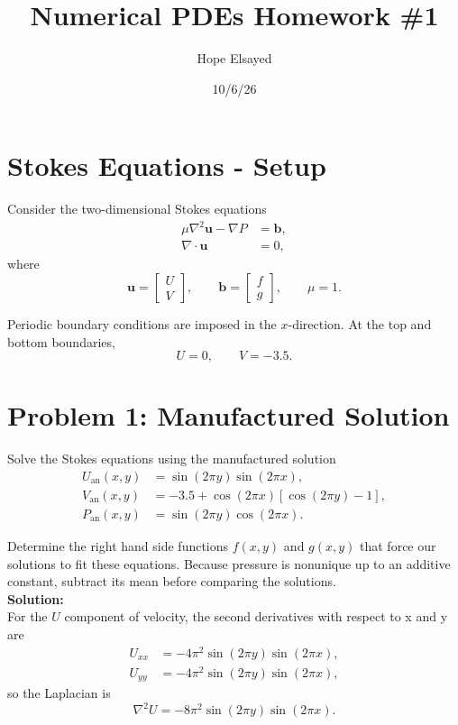\documentclass[11pt]{article}
\title{Numerical PDEs Homework \#1}
\author{Hope Elsayed}
\date{10/6/26}
\begin{document}
\maketitle

\section*{Stokes Equations - Setup}

Consider the two-dimensional Stokes equations
\begin{align*}
    \mu \nabla^2 \mathbf{u} - \nabla P &= \mathbf{b}, \\
    \nabla \cdot \mathbf{u} &= 0,
\end{align*}
where
\[ \mathbf{u} =
\begin{bmatrix}
U \\ V
\end{bmatrix},
\qquad
\mathbf{b} =
\begin{bmatrix}
f \\ g
\end{bmatrix},
\qquad
\mu = 1.
\]

Periodic boundary conditions are imposed in the $x$-direction. 
At the top and bottom boundaries,
\[
U = 0,
\qquad
V = -3.5.
\]
\newpage
\section*{Problem 1: Manufactured Solution}

Solve the Stokes equations using the manufactured solution
\begin{align*}
    U_{\mathrm{an}}(x,y) &= \sin(2\pi y)\sin(2\pi x), \\
    V_{\mathrm{an}}(x,y) &= -3.5
    + \cos(2\pi x)\left[\cos(2\pi y)-1\right], \\
    P_{\mathrm{an}}(x,y) &= \sin(2\pi y)\cos(2\pi x).
\end{align*}

Determine the right hand side functions $f(x,y)$ and $g(x,y)$ that force our solutions to fit these equations. Because pressure is nonunique up to an additive constant, subtract its mean before comparing the solutions. \\

\textbf{Solution: } \\
For the $U$ component of velocity, the second derivatives with respect to x and y are
\begin{align*}
    U_{xx} &= -4\pi^2\sin(2\pi y)\sin(2\pi x), \\
    U_{yy} &= -4\pi^2\sin(2\pi y)\sin(2\pi x),
\end{align*}
so the Laplacian is
\[
    \nabla^2 U
    = -8\pi^2\sin(2\pi y)\sin(2\pi x).
\] \\
\end{document}

